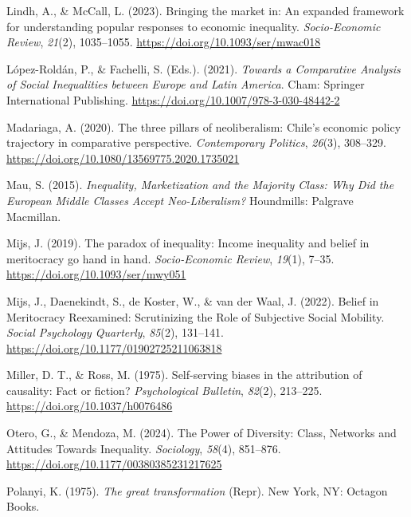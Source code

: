 \documentclass[
  12pt,
]{article}
\newlength{\cslhangindent}
\newenvironment{CSLReferences}[2] %
 {\begin{list}{}{%
  \setlength{\itemindent}{0pt}
  \setlength{\leftmargin}{0pt}
  \setlength{\parsep}{0pt}
  \ifodd #1
   \setlength{\leftmargin}{\cslhangindent}
   \setlength{\itemindent}{-1\cslhangindent}
  \fi
  \setlength{\itemsep}{#2\baselineskip}}}
 {\end{list}}
\begin{document}
\begin{CSLReferences}{1}{0}
Lindh, A., \& McCall, L. (2023). Bringing the market in: An expanded
framework for understanding popular responses to economic inequality.
\emph{Socio-Economic Review}, \emph{21}(2), 1035--1055.
\url{https://doi.org/10.1093/ser/mwac018}

López-Roldán, P., \& Fachelli, S. (Eds.). (2021). \emph{Towards a
{Comparative Analysis} of {Social Inequalities} between {Europe} and
{Latin America}}. Cham: Springer International Publishing.
\url{https://doi.org/10.1007/978-3-030-48442-2}

Madariaga, A. (2020). The three pillars of neoliberalism: {Chile}'s
economic policy trajectory in comparative perspective.
\emph{Contemporary Politics}, \emph{26}(3), 308--329.
\url{https://doi.org/10.1080/13569775.2020.1735021}

Mau, S. (2015). \emph{Inequality, {Marketization} and the {Majority
Class}: {Why Did} the {European Middle Classes Accept Neo-Liberalism}?}
Houndmills: Palgrave Macmillan.

Mijs, J. (2019). The paradox of inequality: Income inequality and belief
in meritocracy go hand in hand. \emph{Socio-Economic Review},
\emph{19}(1), 7--35. \url{https://doi.org/10.1093/ser/mwy051}

Mijs, J., Daenekindt, S., de Koster, W., \& van der Waal, J. (2022).
Belief in {Meritocracy Reexamined}: {Scrutinizing} the {Role} of
{Subjective Social Mobility}. \emph{Social Psychology Quarterly},
\emph{85}(2), 131--141. \url{https://doi.org/10.1177/01902725211063818}

Miller, D. T., \& Ross, M. (1975). Self-serving biases in the
attribution of causality: {Fact} or fiction? \emph{Psychological
Bulletin}, \emph{82}(2), 213--225.
\url{https://doi.org/10.1037/h0076486}

Otero, G., \& Mendoza, M. (2024). The {Power} of {Diversity}: {Class},
{Networks} and {Attitudes Towards Inequality}. \emph{Sociology},
\emph{58}(4), 851--876. \url{https://doi.org/10.1177/00380385231217625}

Polanyi, K. (1975). \emph{The great transformation} (Repr). New York,
NY: Octagon Books.


\end{CSLReferences}
\end{document}
